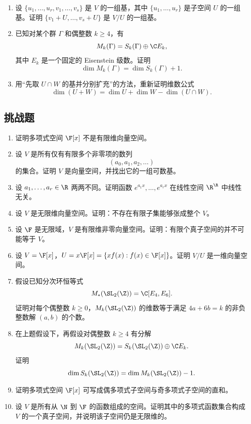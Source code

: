 \begin{enumerate}[label=\arabic*., start=31, leftmargin=2.5em]
  \item \medium 设 $\{u_1,\dots,u_r,v_1,\dots,v_s\}$ 是 $V$ 的一组基，其中 $\{u_1,\dots,u_r\}$ 是子空间 $U$ 的一组基。证明 $\{v_1+U,\dots,v_s+U\}$ 是 $V/U$ 的一组基。
  \item \medium 已知对某个群 $\Gamma$ 和偶整数 $k\ge 4$，有
  \[
  M_k(\Gamma)=S_k(\Gamma)\oplus \C E_k,
  \]
  其中 $E_k$ 是一个固定的 Eisenstein 级数。证明
  \[
  \dim M_k(\Gamma)=\dim S_k(\Gamma)+1.
  \]
  \item \medium 用“先取 $U\cap W$ 的基并分别扩充”的方法，重新证明维数公式
  \[
  \dim(U+W)=\dim U+\dim W-\dim(U\cap W).
  \]
\end{enumerate}

\subsection*{挑战题}
\begin{enumerate}[label=\arabic*., start=51, leftmargin=2.5em]
  \item \hard 证明多项式空间 $\F[x]$ 不是有限维向量空间。
  \item \hard 设 $V$ 是所有仅有有限多个非零项的数列
  \[
  (a_0,a_1,a_2,\dots)
  \]
  的集合。证明 $V$ 是向量空间，并找出它的一组可数基。
  \item \hard 设 $a_1,\dots,a_r\in\R$ 两两不同。证明函数 $e^{a_1x},\dots,e^{a_rx}$ 在线性空间 $\R^{\R}$ 中线性无关。
  \item \hard 设 $V$ 是无限维向量空间。证明：不存在有限子集能够张成整个 $V$。
  \item \hard 设 $\F$ 是无限域，$V$ 是有限维非零向量空间。证明：有限个真子空间的并不可能等于 $V$。
  \item \hard 设 $V=\F[x]$，$U=x\F[x]=\{xf(x):f(x)\in\F[x]\}$。证明 $V/U$ 是一维向量空间。
  \item \hard 假设已知分次环恒等式
  \[
  M_*(\SL_2(\Z))=\C[E_4,E_6].
  \]
  证明对每个偶整数 $k\ge 0$，$M_k(\SL_2(\Z))$ 的维数等于满足 $4a+6b=k$ 的非负整数解 $(a,b)$ 的个数。
  \item \hard 在上题假设下，再假设对偶整数 $k\ge 4$ 有分解
  \[
  M_k(\SL_2(\Z))=S_k(\SL_2(\Z))\oplus \C E_k.
  \]
  证明
  \[
  \dim S_k(\SL_2(\Z))=\dim M_k(\SL_2(\Z))-1.
  \]
  \item \hard 证明多项式空间 $\F[x]$ 可写成偶多项式子空间与奇多项式子空间的直和。
  \item \hard 设 $V$ 是所有从 $\N$ 到 $\F$ 的函数组成的空间。证明其中的多项式函数集合构成 $V$ 的一个真子空间，并说明该子空间仍是无限维的。
\end{enumerate}

